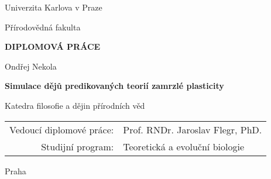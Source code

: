 \documentclass[12pt,a4paper]{report}
\begin{document}


\pagestyle{empty}
\begin{center}

\large

Univerzita Karlova v Praze

\medskip

Přírodovědná fakulta

\vfill

{\bf\Large DIPLOMOVÁ PRÁCE}




\vfill
\vspace{5mm}

{\LARGE Ondřej Nekola}

\vspace{15mm}

{\LARGE\bfseries Simulace dějů predikovaných teorií zamrzlé plasticity}

\vfill

Katedra filosofie a dějin přírodních věd

\vfill

\begin{tabular}{rl}

Vedoucí diplomové práce: & Prof. RNDr. Jaroslav Flegr, PhD.\\
\noalign{\vspace{2mm}}
Studijní program: & Teoretická a evoluční biologie \\
\end{tabular}

\vfill

Praha \the\year

\end{center}

\newpage


\end{document}
